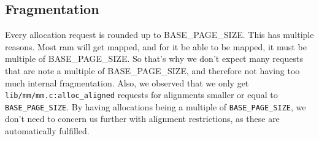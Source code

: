 % 
% 
% 
% 
% 

\subsection{Fragmentation}

Every allocation request is rounded up to BASE\_PAGE\_SIZE.
This has multiple reasons.
Most ram will get mapped, and for it be able to be mapped, it must be multiple
of BASE\_PAGE\_SIZE.
So that's why we don't expect many requests that are note a multiple of
BASE\_PAGE\_SIZE, and therefore not having too much internal fragmentation.
Also, we observed that we only get \verb|lib/mm/mm.c:alloc_aligned| requests for
alignments smaller or equal to \verb|BASE_PAGE_SIZE|.
By having allocations being a multiple of \verb|BASE_PAGE_SIZE|, we don't
need to concern us further with alignment restrictions, as these are
automatically fulfilled.

